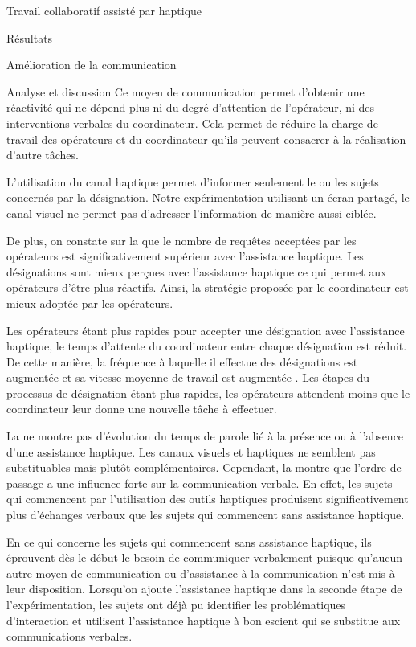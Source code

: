 \documentclass[myfrancais,ngerman,english,french]{mythesis}
\begin{document}
\begin{mychapter}{Travail collaboratif assisté par haptique}
\begin{mysection}{Résultats}
\begin{mysubsection}{Amélioration de la communication}
\begin{mysubsubsection}{Analyse et discussion}
					Ce moyen de communication permet d'obtenir une réactivité qui ne dépend plus ni du degré d'attention de l'opérateur, ni des interventions verbales du coordinateur.
					Cela permet de réduire la charge de travail des opérateurs et du coordinateur qu'ils peuvent consacrer à la réalisation d'autre tâches.

					L'utilisation du canal haptique permet d'informer seulement le ou les sujets concernés par la désignation.
					Notre expérimentation utilisant un écran partagé, le canal visuel ne permet pas d'adresser l'information de manière aussi ciblée.

					De plus, on constate sur la  que le nombre de requêtes acceptées par les opérateurs est significativement supérieur avec l'assistance haptique.
					Les désignations sont mieux perçues avec l'assistance haptique ce qui permet aux opérateurs d'être plus réactifs.
					Ainsi, la stratégie proposée par le coordinateur est mieux adoptée par les opérateurs.

					Les opérateurs étant plus rapides pour accepter une désignation avec l'assistance haptique, le temps d'attente du coordinateur entre chaque désignation est réduit.
					De cette manière, la fréquence à laquelle il effectue des désignations est augmentée et sa vitesse moyenne de travail est augmentée .
					Les étapes du processus de désignation étant plus rapides, les opérateurs attendent moins que le coordinateur leur donne une nouvelle tâche à effectuer.

					La  ne montre pas d'évolution du temps de parole lié à la présence ou à l'absence d'une assistance haptique.
					Les canaux visuels et haptiques ne semblent pas substituables mais plutôt complémentaires.
					Cependant, la  montre que l'ordre de passage a une influence forte sur la communication verbale.
					En effet, les sujets qui commencent par l'utilisation des outils haptiques produisent significativement plus d'échanges verbaux que les sujets qui commencent sans assistance haptique.

					En ce qui concerne les sujets qui commencent sans assistance haptique, ils éprouvent dès le début le besoin de communiquer verbalement puisque qu'aucun autre moyen de communication ou d'assistance à la communication n'est mis à leur disposition.
					Lorsqu'on ajoute l'assistance haptique dans la seconde étape de l'expérimentation, les sujets ont déjà pu identifier les problématiques d'interaction et utilisent l'assistance haptique à bon escient qui se substitue aux communications verbales.


\end{mysubsubsection}
\end{mysubsection}
\end{mysection}
\end{mychapter}
\end{document}
